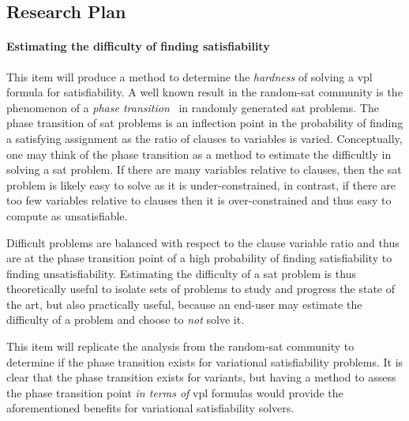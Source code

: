 \subsection{Research Plan}

\paragraph{Estimating the difficulty of finding satisfiability} This item will
produce a method to determine the \emph{hardness} of solving a \ac{vpl} formula
for satisfiability. A well known result in the random-\ac{sat} community is the
phenomenon of a \emph{phase transition}~\cite{Gent94thesat} in randomly
generated \ac{sat} problems. The phase transition of \ac{sat} problems is an
inflection point in the probability of finding a satisfying assignment as the
ratio of clauses to variables is varied. Conceptually, one may think of the
phase transition as a method to estimate the difficultly in solving a \ac{sat}
problem. If there are many variables relative to clauses, then the \ac{sat}
problem is likely easy to solve as it is under-constrained, in contrast, if
there are too few variables relative to clauses then it is over-constrained and
thus easy to compute as unsatisfiable.

Difficult problems are balanced with respect to the clause variable ratio and
thus are at the phase transition point of a high probability of finding
satisfiability to finding unsatisfiability. Estimating the difficulty of a
\ac{sat} problem is thus theoretically useful to isolate sets of problems to
study and progress the state of the art, but also practically useful, because an
end-user may estimate the difficulty of a problem and choose to \emph{not} solve
it.

This item will replicate the analysis from the random-\ac{sat} community to
determine if the phase transition exists for variational satisfiability
problems. It is clear that the phase transition exists for variants, but having
a method to assess the phase transition point \emph{in terms of} \ac{vpl}
formulas would provide the aforementioned benefits for variational
satisfiability solvers.


